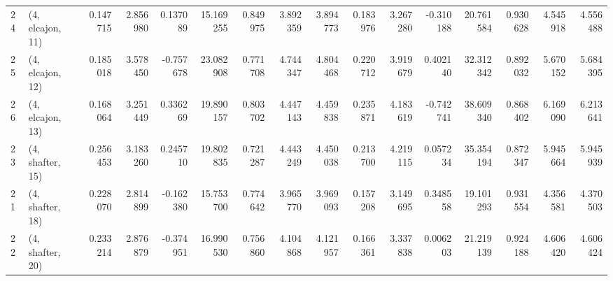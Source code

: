 \begin{tabular}{llrrrrrrrrrrrrrr}
24 &  (4, elcajon, 11) &   0.147715 &  2.856980 &  0.137089 &  15.169255 &  0.849975 &   3.892359 &  3.894773 &  0.183976 &  3.267280 & -0.310188 &   20.761584 &  0.930628 &   4.545918 &   4.556488 \\
25 &  (4, elcajon, 12) &   0.185018 &  3.578450 & -0.757678 &  23.082908 &  0.771708 &   4.744347 &  4.804468 &  0.220712 &  3.919679 &  0.402140 &   32.312342 &  0.892032 &   5.670152 &   5.684395 \\
26 &  (4, elcajon, 13) &   0.168064 &  3.251449 &  0.336269 &  19.890157 &  0.803702 &   4.447143 &  4.459838 &  0.235871 &  4.183619 & -0.742741 &   38.609340 &  0.868402 &   6.169090 &   6.213641 \\
23 &  (4, shafter, 15) &   0.256453 &  3.183260 &  0.245710 &  19.802835 &  0.721287 &   4.443249 &  4.450038 &  0.213700 &  4.219115 &  0.057234 &   35.354194 &  0.872347 &   5.945664 &   5.945939 \\
21 &  (4, shafter, 18) &   0.228070 &  2.814899 & -0.162380 &  15.753700 &  0.774642 &   3.965770 &  3.969093 &  0.157208 &  3.149695 &  0.348558 &   19.101293 &  0.931554 &   4.356581 &   4.370503 \\
22 &  (4, shafter, 20) &   0.233214 &  2.876879 & -0.374951 &  16.990530 &  0.756860 &   4.104868 &  4.121957 &  0.166361 &  3.337838 &  0.006203 &   21.219139 &  0.924188 &   4.606420 &   4.606424 \\
\bottomrule
\end{tabular}

